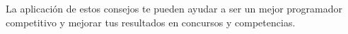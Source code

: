 La aplicación de estos consejos te pueden ayudar a ser un mejor programador competitivo y mejorar tus resultados en concursos y competencias. 